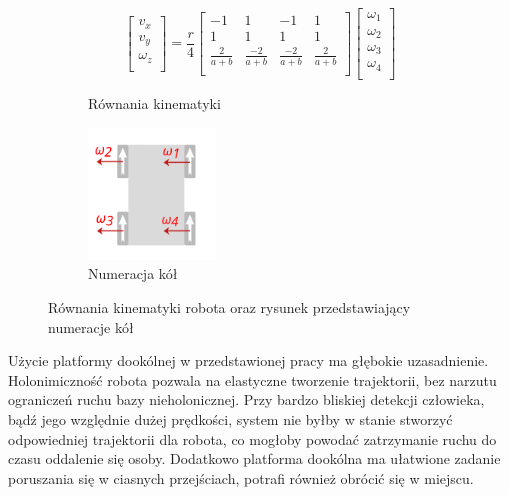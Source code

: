 \begin{figure}[H]
  	\centering 
  	\begin{subfigure}[b]{0.4\textwidth}
  	\begin{equation} \label{eq:kinematic}
	\begin{bmatrix}
	v_x \\
	v_y \\
	\omega_z \\
	\end{bmatrix}
	=
	\frac{r}{4}
	\begin{bmatrix}
	-1 & 1 & -1 & 1 \\
	1 & 1 & 1 & 1 \\
	\frac{2}{a+b} & \frac{-2}{a+b} & \frac{-2}{a+b} & \frac{2}{a+b} \\
	\end{bmatrix}
	\begin{bmatrix}
	\omega_1 \\
	\omega_2 \\
	\omega_3 \\
	\omega_4 \\
	\end{bmatrix}
  	\end{equation}  
  	\caption{Równania kinematyki}
    \label{fig:kinematic_matrix} 
   	\end{subfigure}
  	\begin{subfigure}[b]{0.4\textwidth}
  		\centering
  		\includegraphics[height=3.5cm]{gfx/vectors2.png}
        \caption{Numeracja kół}
        \label{fig:n}
  	\end{subfigure}
  	\caption{Równania kinematyki robota oraz rysunek przedstawiający numeracje kół \cite{omnivelma}}
  	\label{fig:kinematic_main}
\end{figure}

Użycie platformy dookólnej w przedstawionej pracy ma głębokie uzasadnienie. Holonimiczność robota pozwala na elastyczne tworzenie trajektorii, bez narzutu ograniczeń ruchu bazy nieholonicznej. Przy bardzo bliskiej detekcji człowieka, bądź jego względnie dużej prędkości, system nie byłby w stanie stworzyć odpowiedniej trajektorii dla robota, co mogłoby powodać zatrzymanie ruchu do czasu oddalenie się osoby. Dodatkowo platforma dookólna ma ułatwione zadanie poruszania się w ciasnych przejściach, potrafi również obrócić się w miejscu. \\

